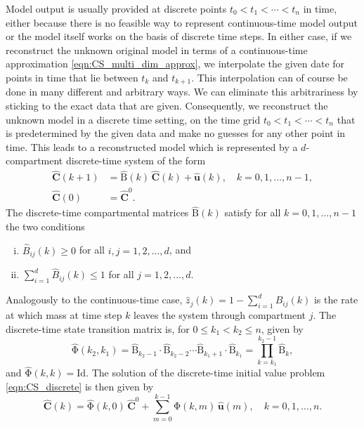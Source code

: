 \documentclass[11pt,a4paper]{article}
\renewcommand{\vec}[1]{\mathbf{#1}}
\newcommand{\tens}[1]{\mathrm{#1}}
\newcommand{\id}{\tens{Id}}
\newcommand{\suml}{\sum\limits}
\begin{document}
    Model output is usually provided at discrete points $t_0<t_1<\cdots<t_n$ in time, either because there is no feasible way to represent continuous-time model output or the model itself works on the basis of discrete time steps.
    In either case, if we reconstruct the unknown original model in terms of a continuous-time approximation \eqref{eqn:CS_multi_dim_approx}, we interpolate the given date for points in time that lie between $t_k$ and $t_{k+1}$.
    This interpolation can of course be done in many different and arbitrary ways.
    We can eliminate this arbitrariness by sticking to the exact data that are given.
    Consequently, we reconstruct the unknown model in a discrete time setting, on the time grid $t_0<t_1<\cdots<t_n$ that is predetermined by the given data and make no guesses for any other point in time.
    This leads to a reconstructed model which is represented by a $d$-compartment discrete-time system of the form
    \begin{equation}\label{eqn:CS_discrete}
        \begin{aligned}
            \widehat{\vec{C}}(k+1) &= \widehat{\tens{B}}(k)\,\widehat{\vec{C}}(k) + \widehat{\vec{u}}(k),\quad k=0,1,\ldots,n-1,\\
            \widehat{\vec{C}}(0) &= \widehat{\vec{C}}^0.
        \end{aligned}
    \end{equation}
    The discrete-time compartmental matrices $\widehat{\tens{B}}(k)$ satisfy for all $k=0,1,\ldots,n-1$ the two conditions
    \begin{enumerate}[(i)]
        \item $\widehat{B}_{ij}(k)\geq0$ for all $i,j=1,2,\ldots,d$, and
        \item $\suml_{i=1}^d \widehat{B}_{ij}(k)\leq 1$ for all $j=1,2,\ldots,d$.
    \end{enumerate}
    Analogously to the continuous-time case, $\widehat{z}_j(k)=1-\sum_{i=1}^d \widehat{B}_{ij}(k)$ is the rate at which mass at time step $k$ leaves the system through compartment $j$.
    The discrete-time state transition matrix is, for $0\leq k_1<k_2\leq n$, given by
    \begin{equation*}
        \widehat{\tens{\Phi}}(k_2,k_1) = \widehat{\tens{B}}_{k_2-1}\cdot\widehat{\tens{B}}_{k_2-2}\cdots\widehat{\tens{B}}_{k_1+1}\cdot\widehat{\tens{B}}_{k_1} = \prod\limits_{k=k_1}^{k_2-1}\widehat{\tens{B}}_k,
    \end{equation*}
    and $\widehat{\tens{\Phi}}(k,k)=\id$.
    The solution of the discrete-time initial value problem \eqref{eqn:CS_discrete} is then given by
    \begin{equation*}
        \widehat{\vec{C}}(k) = \widehat{\tens{\Phi}}(k,0)\,\widehat{\vec{C}}^0 + \suml_{m=0}^{k-1} \widehat{\tens{\Phi}}(k,m)\,\widehat{\vec{u}}(m),\quad k=0,1,\ldots,n.
    \end{equation*}
    
\end{document}
